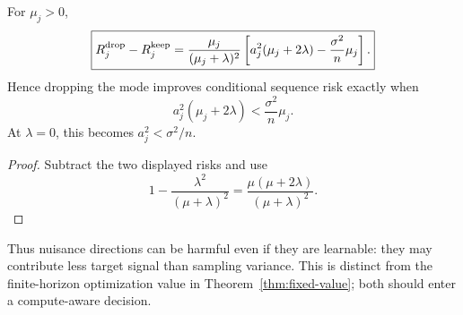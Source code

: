 \begin{theorem}\label{thm:sequence-drop}
For $\mu_j>0$,
\[
\boxed{
R_j^{\rm drop}-R_j^{\rm keep}
=
\frac{\mu_j}{(\mu_j+\lambda)^2}
\left[a_j^2(\mu_j+2\lambda)-\frac{\sigma^2}{n}\mu_j\right].}
\]
Hence dropping the mode improves conditional sequence risk exactly when
\[
\boxed{
a_j^2(\mu_j+2\lambda)<\frac{\sigma^2}{n}\mu_j.}
\]
At $\lambda=0$, this becomes $a_j^2<\sigma^2/n$.
\end{theorem}

\begin{proof}
Subtract the two displayed risks and use
\[
1-\frac{\lambda^2}{(\mu+\lambda)^2}
=\frac{\mu(\mu+2\lambda)}{(\mu+\lambda)^2}.
\]
\end{proof}

Thus nuisance directions can be harmful even if they are learnable: they may contribute less target signal than sampling variance. This is distinct from the finite-horizon optimization value in Theorem~\ref{thm:fixed-value}; both should enter a compute-aware decision.
